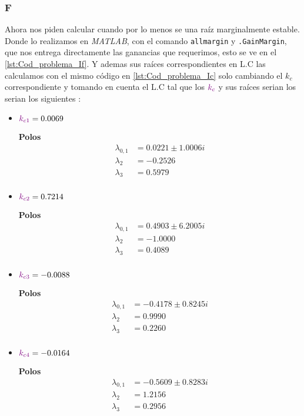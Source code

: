 \FloatBarrier
\subsubsection{F}%
Ahora nos piden calcular cuando por lo menos se una raíz marginalmente estable. 
Donde lo realizamos en \textit{MATLAB}, con el comando \verb|allmargin|  y  \verb|.GainMargin|, que nos entrega directamente las ganancias que requerimos, esto se ve en el \autoref{lst:Cod_problema_If}. Y ademas sus raíces correspondientes en L.C las calculamos con el mismo código en \autoref{lst:Cod_problema_Ic} solo cambiando el \(k_c\) correspondiente y tomando en cuenta el L.C tal que los \( \mathbin{\color{violet}k_c}\) y sus raíces serian los  serian los siguientes : 

\begin{multicols}{2}
  \begin{itemize}
      \item \(\mathbin{\color{violet}k_{c1}} = 0.0069\) 

        \textbf{Polos}
        \begin{align}
        \lambda_{0,1} &=0.0221 \pm 1.0006i \\
        \lambda_{2} &= -0.2526 \\
        \lambda_{3} &= 0.5979 \\
        \end{align}

      \item \(\mathbin{\color{violet}k_{c2}} = 0.7214\)

      \textbf{Polos}
      \begin{align}
        \lambda_{0,1} &= 0.4903 \pm 6.2005i \\
        \lambda_{2} &= -1.0000 \\
        \lambda_{3} &= 0.4089 \\
        \end{align}
  \end{itemize}
  \columnbreak
  \begin{itemize}
      \item \(\mathbin{\color{violet}k_{c3}} = -0.0088\)

      \textbf{Polos}
      \begin{align}
        \lambda_{0,1} &= -0.4178 \pm 0.8245i \\
        \lambda_{2} &= 0.9990 \\
        \lambda_{3} &= 0.2260 \\
        \end{align}

      \item \(\mathbin{\color{violet}k_{c4}} = -0.0164\)

      \textbf{Polos}
      \begin{align}
        \lambda_{0,1} &= -0.5609 \pm 0.8283i \\
        \lambda_{2} &= 1.2156  \\
        \lambda_{3} &= 0.2956  \\
        \end{align}
  \end{itemize}
\end{multicols}

